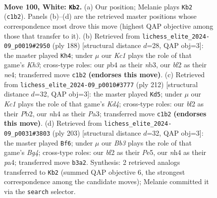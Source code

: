 \documentclass[11pt]{article}
\begin{document}
\begin{figure}[p]\centering
\begin{subfigure}{0.46\textwidth}\centering
\resizebox{\linewidth}{!}{%
\newchessgame
\chessboard[
  setfen={8/1Nn5/7k/8/Pp2P2n/1B2p3/5b1p/2K5 w - - 8 100},
  showmover=false,
  pgfstyle=straightmove, color=movearrow, markmove={c1-b2}
]}
\caption{}
\end{subfigure}\hfill
\begin{subfigure}{0.46\textwidth}\centering
\resizebox{\linewidth}{!}{%
\newchessgame
\chessboard[
  setfen={5k2/8/7p/5p2/2P1nP2/1n2B2K/8/8 w - - 0 95},
  showmover=false,
  pgfstyle=straightmove, color=movearrow, markmove={h3-h4}
]}
\caption{}
\end{subfigure}
\\[4pt]
\begin{subfigure}{0.46\textwidth}\centering
\resizebox{\linewidth}{!}{%
\newchessgame
\chessboard[
  setfen={8/3k4/8/B4p1p/p2K1P1P/P7/1P2b3/8 w - - 3 107},
  showmover=false,
  pgfstyle=straightmove, color=movearrow, markmove={d4-d5}
]}
\caption{}
\end{subfigure}\hfill
\begin{subfigure}{0.46\textwidth}\centering
\resizebox{\linewidth}{!}{%
\newchessgame
\chessboard[
  setfen={8/8/3k4/p3p1b1/P3P2p/3N1P2/8/7K b - - 7 102},
  showmover=false,
  pgfstyle=straightmove, color=movearrow, markmove={g5-f6}
]}
\caption{}
\end{subfigure}
\caption{\textbf{Move 100, White: \texttt{Kb2}.} (a) Our position; Melanie plays \texttt{Kb2} (\texttt{c1b2}). Panels (b)--(d) are the retrieved master positions whose correspondence most drove this move (highest QAP objective among those that transfer to it). (b) Retrieved from \texttt{lichess\_elite\_2024-09\_p0019\#2950} (ply 188) [structural distance $d$=28, QAP obj=3]: the master played \texttt{Kh4}; under $\mu$ our \emph{Kc1} plays the role of that game's \emph{Kh3}; cross-type roles: our \emph{p}b4 as their \emph{n}b3, our \emph{b}f2 as their \emph{n}e4; transferred move \texttt{c1b2} \textbf{(endorses this move)}. (c) Retrieved from \texttt{lichess\_elite\_2024-09\_p0010\#3777} (ply 212) [structural distance $d$=32, QAP obj=3]: the master played \texttt{Kd5}; under $\mu$ our \emph{Kc1} plays the role of that game's \emph{Kd4}; cross-type roles: our \emph{b}f2 as their \emph{P}b2, our \emph{n}h4 as their \emph{P}a3; transferred move \texttt{c1b2} \textbf{(endorses this move)}. (d) Retrieved from \texttt{lichess\_elite\_2024-09\_p0031\#3803} (ply 203) [structural distance $d$=32, QAP obj=3]: the master played \texttt{Bf6}; under $\mu$ our \emph{Bb3} plays the role of that game's \emph{Bg4}; cross-type roles: our \emph{b}f2 as their \emph{P}e5, our \emph{n}h4 as their \emph{p}a4; transferred move \texttt{b3a2}. Synthesis: 2 retrieved analogs transferred to \texttt{Kb2} (summed QAP objective 6, the strongest correspondence among the candidate moves); Melanie committed it via the \texttt{search} selector.}
\label{fig:thought-m198}
\end{figure}
\end{document}
